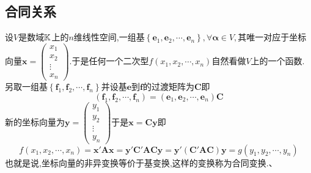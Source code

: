 \subsection{合同关系}
设$V$是数域$\mathbb{K} $上的$n$维线性空间,一组基$\left\{
    \bm{e}_1,\bm{e}_2,\cdots,\bm{e}_n
    \right\},\forall\bm{\alpha}\in V,$其唯一对应于坐标向量$\bm{x}=\begin{pmatrix}
        x_1 \\x_2\\\vdots\\x_n
    \end{pmatrix}$.于是任何一个二次型$
    f\left(
    x_1,x_2,\cdots,x_n
    \right)
$自然看做$V$上的一个函数.另取一组基$\left\{
    \bm{f}_1,\bm{f}_2,\cdots,\bm{f}_n
    \right\}$并设基$\bm{e}$到$\bm{f}$的过渡矩阵为$\bm{C}$即\[
    \left(
    \bm{f}_1,\bm{f}_2,\cdots,\bm{f}_n
    \right)=\left(
    \bm{e}_1,\bm{e}_2,\cdots,\bm{e}_n
    \right)\bm{C}
\]新的坐标向量为$\bm{y}=\begin{pmatrix}
        y_1 \\y_2\\\vdots\\y_n
    \end{pmatrix}$于是$\bm{x}=\bm{Cy}$即\[
    f\left(
    x_1,x_2,\cdots,x_n
    \right)=\bm{x}'\bm{Ax}=\bm{y}'\bm{C}'\bm{ACy}=\bm{y}'\left(
    \bm{C}'\bm{AC}
    \right)\bm{y}=g\left(
    y_1,y_2,\cdots,y_n
    \right)
\]也就是说,坐标向量的非异变换等价于基变换,这样的变换称为合同变换.、
